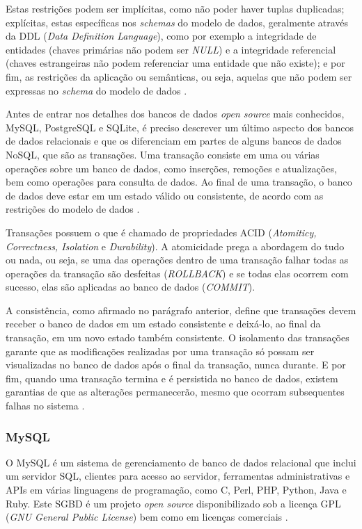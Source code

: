 \documentclass[diss]{template/setrem}
\begin{document}
Estas restrições podem ser implícitas, como não poder haver tuplas duplicadas; explícitas, estas específicas nos \emph{schemas} do modelo de dados, geralmente através da DDL (\emph{Data Definition Language}), como por exemplo a integridade de entidades (chaves primárias não podem ser \emph{NULL}) e a integridade referencial (chaves estrangeiras não podem referenciar uma entidade que não existe); e por fim, as restrições da aplicação ou semânticas, ou seja, aquelas que não podem ser expressas no \emph{schema} do modelo de dados \citep{Elmasri2011}.

Antes de entrar nos detalhes dos bancos de dados \emph{open source} mais conhecidos, MySQL, PostgreSQL e SQLite, é preciso descrever um último aspecto dos bancos de dados relacionais e que os diferenciam em partes de alguns bancos de dados NoSQL, que são as transações. Uma transação consiste em uma ou várias operações sobre um banco de dados, como inserções, remoções e atualizações, bem como operações para consulta de dados. Ao final de uma transação, o banco de dados deve estar em um estado válido ou consistente, de acordo com as restrições do modelo de dados \citep{Elmasri2011}.

Transações possuem o que é chamado de propriedades ACID (\emph{Atomiticy, Correctness, Isolation} e \emph{Durability}). A atomicidade prega a abordagem do tudo ou nada, ou seja, se uma das operações dentro de uma transação falhar todas as operações da transação são desfeitas (\emph{ROLLBACK}) e se todas elas ocorrem com sucesso, elas são aplicadas ao banco de dados (\emph{COMMIT}).

A consistência, como afirmado no parágrafo anterior, define que transações devem receber o banco de dados em um estado consistente e deixá-lo, ao final da transação, em um novo estado também consistente. O isolamento das transações garante que as modificações realizadas por uma transação só possam ser visualizadas no banco de dados após o final da transação, nunca durante. E por fim, quando uma transação termina e é persistida no banco de dados, existem garantias de que as alterações permanecerão, mesmo que ocorram subsequentes falhas no sistema \citep{Date2004}.

\subsubsection{MySQL}
\label{subsubsec:mysql}
O MySQL é um sistema de gerenciamento de banco de dados relacional que inclui um servidor SQL, clientes para acesso ao servidor, ferramentas administrativas e APIs em várias linguagens de programação, como C, Perl, PHP, Python, Java e Ruby. Este SGBD é um projeto \emph{open source} disponibilizado sob a licença GPL (\emph{GNU General Public License}) bem como em licenças comerciais \citep{Dubois2009}.
\end{document}
